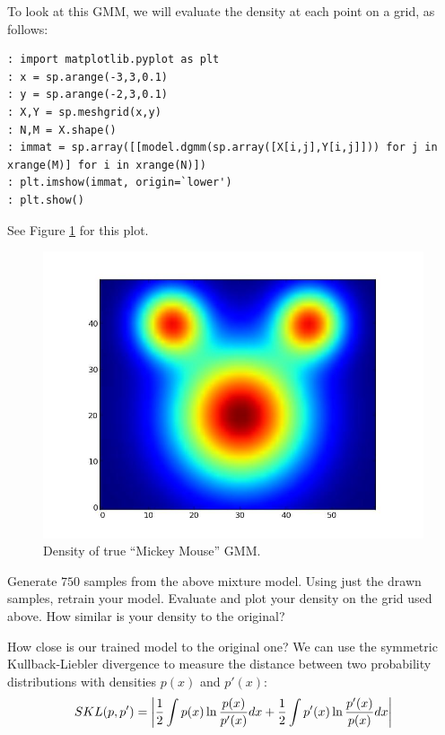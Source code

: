 To look at this GMM, we will evaluate the density at each point on a grid, as follows:
\begin{lstlisting}
: import matplotlib.pyplot as plt
: x = sp.arange(-3,3,0.1)
: y = sp.arange(-2,3,0.1)
: X,Y = sp.meshgrid(x,y)
: N,M = X.shape()
: immat = sp.array([[model.dgmm(sp.array([X[i,j],Y[i,j]])) for j in xrange(M)] for i in xrange(N)])
: plt.imshow(immat, origin=`lower')
: plt.show()
\end{lstlisting}

See Figure \ref{fig:mickeygmm} for this plot.
\begin{figure}[h]
\centering
\includegraphics[width=\textwidth]{truemickeygmm.jpeg}
\caption{Density of true ``Mickey Mouse'' GMM.}
\label{fig:mickeygmm}
\end{figure}

\begin{problem}
Generate $750$ samples from the above mixture model. Using just the drawn samples, retrain your model. Evaluate and plot your density on the grid used above. How similar is your density to the original?
\end{problem}

How close is our trained model to the original one? We can use the symmetric Kullback-Liebler divergence to measure the distance between two probability distributions with densities $p(x)$ and $p'(x)$:
\begin{equation*}
SKL(p,p') = \left\lvert\frac{1}{2} \int p(x) \ln \frac{p(x)}{p'(x)} dx + \frac{1}{2} \int p'(x) \ln \frac{p'(x)}{p(x)} dx\right\rvert
\end{equation*}

